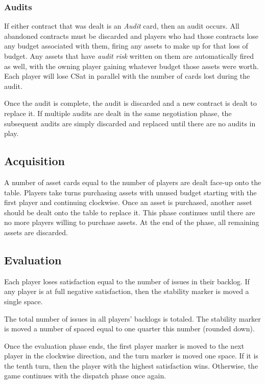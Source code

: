 \documentclass[twocolumn]{article}
\begin{document}
\subsubsection*{Audits}

If either contract that was dealt is an \emph{Audit} card, then an audit occurs. All abandoned contracts must be discarded and players who had those contracts lose any budget associated with them, firing any assets to make up for that loss of budget. Any assets that have \emph{audit risk} written on them are automatically fired as well, with the owning player gaining whatever budget those assets were worth. Each player will lose CSat in parallel with the number of cards lost during the audit.

Once the audit is complete, the audit is discarded and a new contract is dealt to replace it. If multiple audits are dealt in the same negotiation phase, the subsequent audits are simply discarded and replaced until there are no audits in play.

\subsection*{Acquisition}

A number of asset cards equal to the number of players are dealt face-up onto the table. Players take turns purchasing assets with unused budget starting with the first player and continuing clockwise. Once an asset is purchased, another asset should be dealt onto the table to replace it. This phase continues until there are no more players willing to purchase assets. At the end of the phase, all remaining assets are discarded.

\subsection*{Evaluation}

Each player loses satisfaction equal to the number of issues in their backlog. If any player is at full negative satisfaction, then the stability marker is moved a single space.

The total number of issues in all players' backlogs is totaled. The stability marker is moved a number of spaced equal to one quarter this number (rounded down).

Once the evaluation phase ends, the first player marker is moved to the next player in the clockwise direction, and the turn marker is moved one space. If it is the tenth turn, then the player with the highest satisfaction wins. Otherwise, the game continues with the dispatch phase once again.
\end{document}
